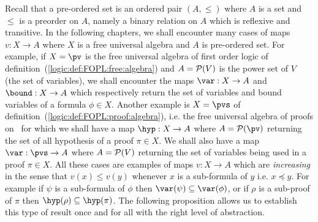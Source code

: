 
Recall that a pre-ordered set is an ordered pair $(A,\leq)$ where
$A$ is a set and $\leq$ is a preorder on $A$, namely a binary
relation on $A$ which is reflexive and transitive. In the following
chapters, we shall encounter many cases of maps $v:X\to A$ where $X$
is a free universal algebra and $A$ is pre-ordered set. For example,
if $X=\pv$ is the free universal algebra of first order logic of
definition~(\ref{logic:def:FOPL:free:algebra}) and $A={\cal P}(V)$
is the power set of $V$ (the set of variables), we shall encounter
the maps $\var:X\to A$ and $\bound:X\to A$ which respectively return
the set of variables and bound variables of a formula $\phi\in X$.
Another example is $X=\pvs$ of
definition~(\ref{logic:def:FOPL:proof:algebra}), i.e. the free
universal algebra of proofs on \pv\ for which we shall have a map
$\hyp:X\to A$ where $A={\cal P}(\pv)$ returning the set of all
hypothesis of a proof $\pi\in X$. We shall also have a map
$\var:\pvs\to A$ where $A={\cal P}(V)$ returning the set of
variables being used in a proof $\pi\in X$. All these cases are
examples of maps $v:X\to A$ which are {\em increasing} in the sense
that $v(x)\leq v(y)$ whenever $x$ is a sub-formula of $y$ i.e.
$x\preceq y$. For example if $\psi$ is a sub-formula of $\phi$ then
$\var(\psi)\subseteq\var(\phi)$, or if $\rho$ is a sub-proof of
$\pi$ then $\hyp(\rho)\subseteq\hyp(\pi)$. The following proposition
allows us to establish this type of result once and for all with the
right level of abstraction.

